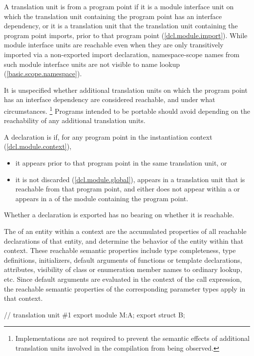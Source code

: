 \begin{std.txt}\color{addclr}
\resetalinea[0]
\alinea
A translation unit is  from a program point if
it is a module interface unit on which the translation unit containing the
program point has an interface dependency, or
it is a translation unit that the translation unit containing the
program point imports,
prior to that program point (\ref{dcl.module.import}).
\enternote
While module interface units are reachable even when they are only
transitively imported via a non-exported import declaration,
namespace-scope names from such module interface units are not visible
to name lookup (\ref{basic.scope.namespace}).
\exitnote

\alinea
It is unspecified whether additional translation units on which the
program point has an interface dependency are considered reachable,
and under what circumstances.%
\footnote{Implementations are not required to prevent the semantic effects of
additional translation units involved in the compilation from being
observed.}
Programs intended to be portable should avoid
depending on the reachability of any additional translation units.

\alinea
A declaration is  if, for any program point in the
instantiation context (\ref{dcl.module.context}),
\begin{itemize}
\item it appears prior to that program point in the same translation unit, or
\item it is not discarded (\ref{dcl.module.global}),
appears in a translation unit that is reachable from that program point,
and
either does not appear within a 
or appears in a 
of the module containing the program point.
\end{itemize}
\enternote
Whether a declaration is exported has no bearing on whether it is reachable.
\exitnote

\alinea
The  of an entity within a context
are the accumulated properties of all reachable declarations of
that entity, and determine the behavior of the entity within
that context.
\enternote
These reachable semantic properties include type completeness,
type definitions, initializers,
default arguments of functions or template declarations, attributes,
visibility of class or enumeration member names to ordinary lookup,
etc.
Since default arguments are evaluated in the context of the call expression,
the reachable semantic properties of the corresponding parameter types apply in 
that context.
\begin{example}
\begin{codeblock}
// translation unit \#1
export module M:A;
export struct B;


\end{codeblock}
\end{example}
\end{std.txt}
